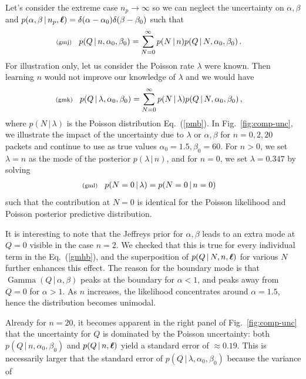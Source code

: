 \documentclass[11pt]{article}
\newcommand{\lleq}[1]{\label{#1} }
\renewcommand{\lleq}[1]{\label{#1} {\scriptstyle {\rm (#1)}} \hspace*{2ex} }
\newcommand{\cond}{\,|\,}
\newcommand{\refeq}[1]{Eq.~(\ref{#1})}
\newcommand{\reffig}[1]{Fig.~\ref{fig:#1}}
\DeclareMathOperator{\GammaDist}{Gamma}
\newcommand{\npack}{{n_p}}
\newcommand{\Lumtot}{Q}
\begin{document}
Let's consider the extreme case $\npack \to \infty$ so we can neglect
the uncertainty on $\alpha, \beta$ and
$p(\alpha, \beta \cond \npack, \bml) =
\delta(\alpha-\alpha_0)\delta(\beta - \beta_0)$ such that
\begin{align}
  \lleq{gmj}
  p(Q\cond n, \alpha_0, \beta_0)
  &=     \sum_{N=0}^\infty p(N\cond n) p(Q\cond N, \alpha_0, \beta_0) \, .
\end{align}
For illustration only, let us consider the Poisson rate $\lambda$ were
known. Then learning $n$ would not improve our knowledge of $\lambda$
and we would have
\begin{align}
  \lleq{gmk}
  p(Q\cond \lambda, \alpha_0, \beta_0)
  &=     \sum_{N=0}^\infty p(N\cond \lambda) p(Q\cond N, \alpha_0, \beta_0) \, ,
\end{align}
where $p(N \cond \lambda)$ is the Poisson distribution \refeq{pmb}.
In \reffig{comp-unc}, we illustrate the impact of the uncertainty due
to $\lambda$ or $\alpha, \beta$ for $n=0,2, 20$ packets and continue
to use as true values $\alpha_0 = 1.5, \beta_0 = 60$. For $n>0$, we
set $\lambda=n$ as the mode of the posterior $p(\lambda \cond n)$, and
for $n=0$, we set $\lambda = 0.347$ by solving
\begin{align}
  \lleq{gml}
  p(N=0 \cond \lambda) &= p(N=0 \cond n=0)
\end{align}
such that the contribution at $N=0$ is identical for the Poisson
likelihood and Poisson posterior predictive distribution.

It is interesting to note that the Jeffreys prior for $\alpha, \beta$
leads to an extra mode at $\Lumtot = 0$ visible in the case $n=2$. We
checked that this is true for every individual term in the
\refeq{gmhb}, and the superposition of $p(\Lumtot \cond N, n, \bml)$
for various $N$ further enhances this effect. The reason for the
boundary mode is that $\GammaDist(\Lumtot \cond \alpha, \beta)$ peaks
at the boundary for $\alpha<1$, and peaks away from $\Lumtot=0$ for
$\alpha>1$. As $n$ increases, the likelihood concentrates around
$\alpha=1.5$, hence the distribution becomes unimodal.

Already for $n=20$, it becomes apparent in the right panel of
\reffig{comp-unc} that the uncertainty for $\Lumtot$ is dominated by
the Poisson uncertainty: both $p(Q \cond n, \alpha_0, \beta_0)$ and
$p(Q \cond n, \bml)$ yield a standard error of $\approx 0.19$. This is
necessarily larger that the standard error of
$p(\Lumtot \cond \lambda, \alpha_0, \beta_0)$ because the variance of
\end{document}
